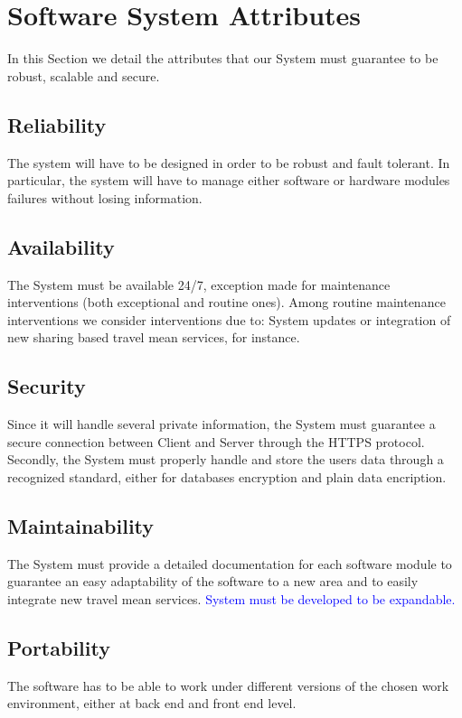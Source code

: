 \section{Software System Attributes}
In this Section we detail the attributes that our System must guarantee to be robust, scalable and secure.

\subsection{Reliability} 
The system will have to be designed in order to be robust and fault tolerant. In particular, the system will have to manage either software or hardware modules failures without losing information.

\subsection{Availability}
The System must be available 24/7, exception made for maintenance interventions (both exceptional and routine ones). Among routine maintenance interventions we consider interventions due to: System updates or integration of new sharing based travel mean services, for instance.  


\subsection{Security}
Since it will handle several private information, the System must guarantee a secure connection between Client and Server through the HTTPS protocol.
Secondly, the System must properly handle and store the users data through a recognized standard, either for databases encryption and plain data encription. 

\subsection{Maintainability}
The System must provide a detailed documentation for each software module to guarantee an easy adaptability of the software to a new area and to easily integrate new travel mean services.  
\textcolor{blue}{System must be developed to be expandable.}

\subsection{Portability}

The software has to be able to work under different versions of the chosen work environment, either at back end and front end level.